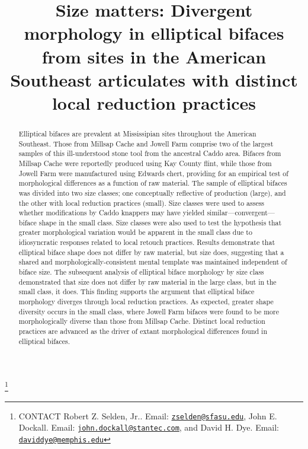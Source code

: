 \documentclass[]{interact}
\theoremstyle{plain}%
\theoremstyle{definition}
\theoremstyle{remark}
\begin{document}

\title{Size matters: Divergent morphology in elliptical bifaces from
sites in the American Southeast articulates with distinct local
reduction practices}


\author{
}

\thanks{CONTACT Robert Z. Selden,
Jr.. Email: \href{mailto:zselden@sfasu.edu}{\nolinkurl{zselden@sfasu.edu}}, John
E.
Dockall. Email: \href{mailto:john.dockall@stantec.com}{\nolinkurl{john.dockall@stantec.com}}, and
David H.
Dye. Email: \href{mailto:daviddye@memphis.edu}{\nolinkurl{daviddye@memphis.edu}}}

\maketitle

\begin{abstract}
Elliptical bifaces are prevalent at Mississipian sites throughout the
American Southeast. Those from Millsap Cache and Jowell Farm comprise
two of the largest samples of this ill-understood stone tool from the
ancestral Caddo area. Bifaces from Millsap Cache were reportedly
produced using Kay County flint, while those from Jowell Farm were
manufactured using Edwards chert, providing for an empirical test of
morphological differences as a function of raw material. The sample of
elliptical bifaces was divided into two size classes; one conceptually
reflective of production (large), and the other with local reduction
practices (small). Size classes were used to assess whether
modifications by Caddo knappers may have yielded
similar---convergent---biface shape in the small class. Size classes
were also used to test the hypothesis that greater morphological
variation would be apparent in the small class due to idiosyncratic
responses related to local retouch practices. Results demonstrate that
elliptical biface shape does not differ by raw material, but size does,
suggesting that a shared and morphologically-consistent mental template
was maintained independent of biface size. The subsequent analysis of
elliptical biface morphology by size class demonstrated that size does
not differ by raw material in the large class, but in the small class,
it does. This finding supports the argument that elliptical biface
morphology diverges through local reduction practices. As expected,
greater shape diversity occurs in the small class, where Jowell Farm
bifaces were found to be more morphologically diverse than those from
Millsap Cache. Distinct local reduction practices are advanced as the
driver of extant morphological differences found in elliptical bifaces.
\end{abstract}
\end{document}
